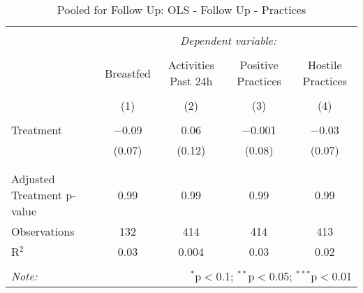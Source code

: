 
\begin{table}[!htbp] \centering 
  \caption{Pooled for Follow Up: OLS - Follow Up - Practices} 
  \label{tbl:Pooled for Follow Up: OLS - Follow Up - Practices} 
\begin{tabular}{@{\extracolsep{5pt}}lcccc} 
\\[-1.8ex]\hline 
\hline \\[-1.8ex] 
 & \multicolumn{4}{c}{\textit{Dependent variable:}} \\ 
\cline{2-5} 
\\[-1.8ex] & Breastfed & Activities Past 24h & Positive Practices & Hostile Practices \\ 
\\[-1.8ex] & (1) & (2) & (3) & (4)\\ 
\hline \\[-1.8ex] 
 Treatment & $-$0.09 & 0.06 & $-$0.001 & $-$0.03 \\ 
  & (0.07) & (0.12) & (0.08) & (0.07) \\ 
  & & & & \\ 
\hline \\[-1.8ex] 
Adjusted Treatment p-value & 0.99 & 0.99 & 0.99 & 0.99 \\ 
Observations & 132 & 414 & 414 & 413 \\ 
R$^{2}$ & 0.03 & 0.004 & 0.03 & 0.02 \\ 
\hline 
\hline \\[-1.8ex] 
\textit{Note:}  & \multicolumn{4}{r}{$^{*}$p$<$0.1; $^{**}$p$<$0.05; $^{***}$p$<$0.01} \\ 
\end{tabular} 
\end{table} 
